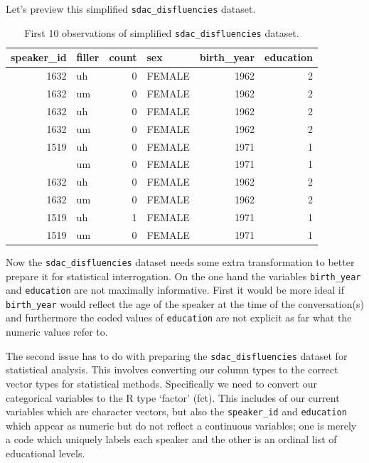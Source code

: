 \documentclass[
  letterpaper,
]{latex/krantz}
\begin{document}
Let's preview this simplified \texttt{sdac\_disfluencies} dataset.

\hypertarget{tbl-i-sdac-disfluencies-preview}{}
\begin{table}
\caption{\label{tbl-i-sdac-disfluencies-preview}First 10 observations of simplified \texttt{sdac\_disfluencies} dataset. }\tabularnewline

\centering
\begin{tabular}{rlrlrr}
\toprule
speaker\_id & filler & count & sex & birth\_year & education\\
\midrule
1632 & uh & 0 & FEMALE & 1962 & 2\\
1632 & um & 0 & FEMALE & 1962 & 2\\
1632 & uh & 0 & FEMALE & 1962 & 2\\
1632 & um & 0 & FEMALE & 1962 & 2\\
1519 & uh & 0 & FEMALE & 1971 & 1\\
\addlinespace
1519 & um & 0 & FEMALE & 1971 & 1\\
1632 & uh & 0 & FEMALE & 1962 & 2\\
1632 & um & 0 & FEMALE & 1962 & 2\\
1519 & uh & 1 & FEMALE & 1971 & 1\\
1519 & um & 0 & FEMALE & 1971 & 1\\
\bottomrule
\end{tabular}
\end{table}

Now the \texttt{sdac\_disfluencies} dataset needs some extra
transformation to better prepare it for statistical interrogation. On
the one hand the variables \texttt{birth\_year} and \texttt{education}
are not maximally informative. First it would be more ideal if
\texttt{birth\_year} would reflect the age of the speaker at the time of
the conversation(s) and furthermore the coded values of
\texttt{education} are not explicit as far what the numeric values refer
to.

The second issue has to do with preparing the
\texttt{sdac\_disfluencies} dataset for statistical analysis. This
involves converting our column types to the correct vector types for
statistical methods. Specifically we need to convert our categorical
variables to the R type `factor' (fct). This includes of our current
variables which are character vectors, but also the \texttt{speaker\_id}
and \texttt{education} which appear as numeric but do not reflect a
continuous variables; one is merely a code which uniquely labels each
speaker and the other is an ordinal list of educational levels.
\end{document}
